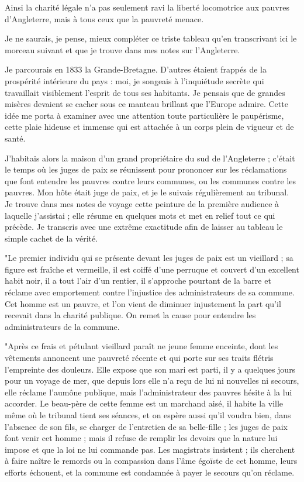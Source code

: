 \documentclass[french,twoside]{book} %
\begin{document}
Ainsi la charité légale n’a pas seulement ravi la liberté locomotrice aux pauvres d’Angleterre, mais à tous ceux que la pauvreté menace.\par
Je ne saurais, je pense, mieux compléter ce triste tableau qu’en transcrivant ici le morceau suivant et que je trouve dans mes notes sur l’Angleterre.\par
Je parcourais en 1833 la Grande-Bretagne. D'autres étaient frappés de la prospérité intérieure du pays : moi, je songeais à l’inquiétude secrète qui travaillait visiblement l’esprit de tous ses habitants. Je pensais que de grandes misères devaient se cacher sous ce manteau brillant que l’Europe admire. Cette idée me porta à examiner avec une attention toute particulière le paupérisme, cette plaie hideuse et immense qui est attachée à un corps plein de vigueur et de santé.\par
J'habitais alors la maison d’un grand propriétaire du sud de l’Angleterre ; c’était le temps où les juges de paix se réunissent pour prononcer sur les réclamations que font entendre les pauvres contre leurs communes, ou les communes contre les pauvres. Mon hôte était juge de paix, et je le suivais régulièrement au tribunal. Je trouve dans mes notes de voyage cette peinture de la première audience à laquelle j’assistai ; elle résume en quelques mots et met en relief tout ce qui précède. Je transcris avec une extrême exactitude afin de laisser au tableau le simple cachet de la vérité.\par
"Le premier individu qui se présente devant les juges de paix est un vieillard ; sa figure est fraîche et vermeille, il est coiffé d’une perruque et couvert d’un excellent habit noir, il a tout l’air d’un rentier, il s’approche pourtant de la barre et réclame avec emportement contre l’injustice des administrateurs de sa commune. Cet homme est un pauvre, et l’on vient de diminuer injustement la part qu’il recevait dans la charité publique. On remet la cause pour entendre les administrateurs de la commune.\par
"Après ce frais et pétulant vieillard paraît ne jeune femme enceinte, dont les vêtements annoncent une pauvreté récente et qui porte sur ses traits flétris l’empreinte des douleurs. Elle expose que son mari est parti, il y a quelques jours pour un voyage de mer, que depuis lors elle n’a reçu de lui ni nouvelles ni secours, elle réclame l’aumône publique, mais l’administrateur des pauvres hésite à la lui accorder. Le beau-père de cette femme est un marchand aisé, il habite la ville même où le tribunal tient ses séances, et on espère aussi qu’il voudra bien, dans l’absence de son fils, se charger de l’entretien de sa belle-fille ; les juges de paix font venir cet homme ; mais il refuse de remplir les devoirs que la nature lui impose et que la loi ne lui commande pas. Les magistrats insistent ; ils cherchent à faire naître le remords ou la compassion dans l’âme égoïste de cet homme, leurs efforts échouent, et la commune est condamnée à payer le secours qu’on réclame.\par
\end{document}
